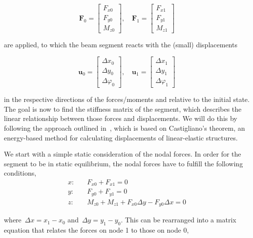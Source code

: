 \begin{equation}
\boldsymbol{F}_{0} = \begin{bmatrix}
F_{x0} \\ F_{y0} \\ M_{z0}
\end{bmatrix},
\quad
\boldsymbol{F}_{1} = \begin{bmatrix}
F_{x1} \\ F_{y1} \\ M_{z1}
\end{bmatrix}
\end{equation}

are applied, to which the beam segment reacts with the (small) displacements

\begin{equation}
\boldsymbol{u}_{0} = \begin{bmatrix}
\Delta x_0 \\ \Delta y_0 \\ \Delta \varphi_0
\end{bmatrix},
\quad
\boldsymbol{u}_{1} = \begin{bmatrix}
\Delta x_1 \\ \Delta y_1 \\ \Delta \varphi_1
\end{bmatrix}
\end{equation}

in the respective directions of the forces/moments and relative to the initial state.
The goal is now to find the stiffness matrix of the segment, which describes the linear relationship between those forces and displacements.
We will do this by following the approach outlined in~\cite{bib:curved-beam-stiffness-matrix}, which is based on Castigliano's theorem, an energy-based method for calculating displacements of linear-elastic structures.

We start with a simple static consideration of the nodal forces.
In order for the segment to be in static equilibrium, the nodal forces have to fulfill the following conditions,
%
\begin{align}
x:\quad &F_{x0} + F_{x1} = 0 \\
y:\quad &F_{y0} + F_{y1} = 0 \\
z:\quad &M_{z0} + M_{z1} + F_{x0}\Delta y - F_{y0}\Delta x = 0
\end{align}

where~$\Delta x = x_1 - x_0$ and~$\Delta y = y_1 - y_0$.
This can be rearranged into a matrix equation that relates the forces on node 1 to those on node 0,

